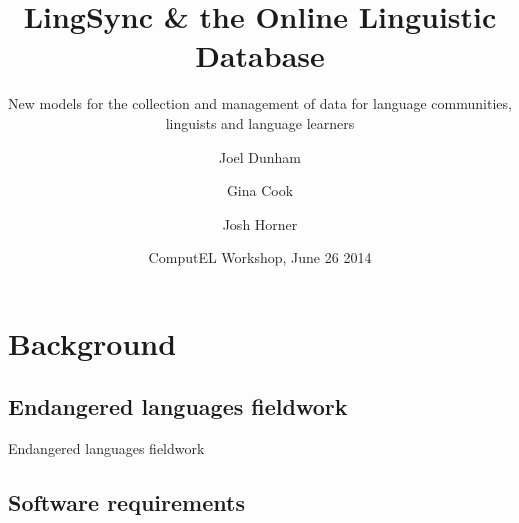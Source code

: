 \documentclass{beamer}
\begin{document}
\title[LingSync \& OLD] %
{LingSync \& the Online Linguistic Database}



\author[~]{Joel Dunham  \and Gina Cook  \and Josh Horner }
                 

\subtitle
{New models for the collection and management of data for language communities, linguists and
language learners}



\date[ComputEL 2014] %
{ComputEL Workshop, June 26 2014}




\begin{frame}
  \titlepage
\end{frame}

\section{Background}

\subsection[Fieldwork]{Endangered languages fieldwork}\label{sec:fieldwork}

\begin{frame}
Endangered languages fieldwork
\end{frame}

\subsection[Requirements]{Software requirements}
\end{document}
